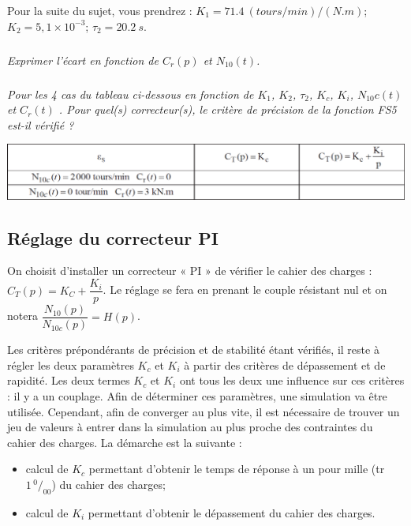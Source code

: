 \documentclass[10pt,fleqn]{article} %
\begin{document}
\begin{multicols}{2}
Pour la suite du sujet, vous prendrez : $K_1 =\SI{71,4}{(tours/min)/(N.m)}$; $K_2=5,1 \times 10^{-3}$; $\tau_2 = \SI{20,2}{s}$.


\subparagraph{}\textit{Exprimer l'écart en fonction de $C_r(p)$ et $N_{10}(t)$.}
\ifprof
\begin{corrige}
\end{corrige}
\else
\fi

\subparagraph{}\textit{Pour les 4 cas du tableau ci-dessous en fonction de $K_1$, $K_2$, $\tau_2$, $K_c$, $K_i$, $N_{10}c (t)$ et $C_r (t)$ . Pour quel(s) correcteur(s), le critère de précision de la fonction FS5 est-il vérifié ?}
\ifprof
\begin{corrige}
\end{corrige}
\else
\fi

\begin{center}
\includegraphics[width=\linewidth]{images/fig_06}
\end{center}


\subsection*{Réglage du correcteur PI}

On choisit d’installer un correcteur « PI » de vérifier le cahier des charges : $C_T(p)=K_C + \dfrac{K_i}{p}$.
Le réglage se fera en prenant le couple résistant nul et on notera $\dfrac{N_{10}(p)}{N_{10c}(p)}=H(p)$.

Les critères prépondérants de précision et de stabilité étant vérifiés, il reste à régler les deux paramètres
$K_c$ et $K_i$ à partir des critères de dépassement et de rapidité. Les deux termes $K_c$ et $K_i$ ont tous
les deux une influence sur ces critères : il y a un couplage. Afin de déterminer ces paramètres, une
simulation va être utilisée. Cependant, afin de converger au plus vite, il est nécessaire de trouver un
jeu de valeurs à entrer dans la simulation au plus proche des contraintes du cahier des charges. La
démarche est la suivante :
\begin{itemize}
\item calcul de $K_c$ permettant d’obtenir le temps de réponse à un pour mille (tr$1 \,^0\!/_{00}$) du cahier des
charges;
\item calcul de $K_i$ permettant d’obtenir le dépassement du cahier des charges.
\end{itemize}




\end{multicols}
\end{document}

